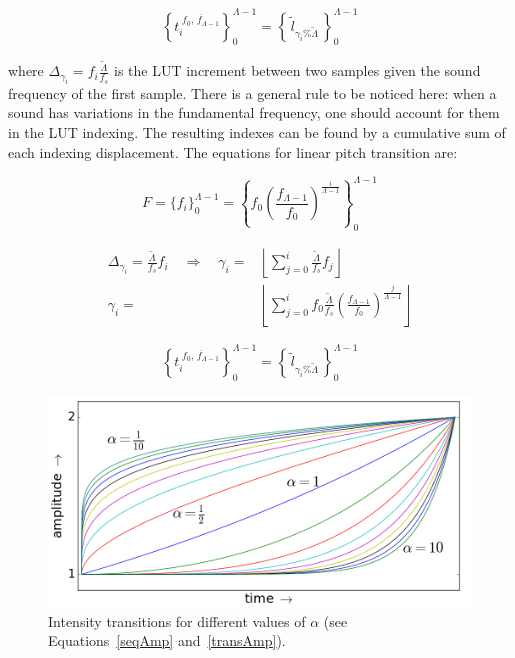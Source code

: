 \begin{equation}\label{serieAmostralLin}
 \left\{t_i^{\;\overline{f_0,\, f_{\Lambda-1}}}\right\}_0^{\Lambda-1}=\left\{\,\widetilde{l}_{\gamma_i \% \widetilde{\Lambda}}\,\right\}_0^{\Lambda-1}
\end{equation}

\noindent where $\Delta_{\gamma_i}=f_i\frac{\widetilde{\Lambda}}{f_s}$ is the LUT increment between two samples given the sound frequency of the first sample.
There is a general rule to be noticed here: when a sound has variations in the fundamental frequency,
one should account for them in the LUT indexing.
The resulting indexes can be found by a cumulative sum of each indexing displacement.
The equations for linear pitch transition are:

\begin{equation}\label{freqExponencial}
 F=\{f_i\}_0^{\Lambda-1}=  \left\{f_0 \left ( \frac{f_{\Lambda-1}}{f_0} \right ) ^{\frac{i}{\Lambda -1}} \right\}_0^{\Lambda-1}
\end{equation}

\begin{equation}\label{indiceExponencial}
\begin{split}
 \Delta_{\gamma_i}= \frac{\widetilde{\Lambda}}{f_s}f_i \quad \Rightarrow  \quad \gamma_i= & \left \lfloor \sum_{j=0}^{i} \frac{\widetilde{\Lambda}}{f_s}f_j \right \rfloor \\
	\gamma_i = & \left \lfloor \sum_{j=0}^{i} f_0 \frac{\widetilde{\Lambda}}{f_s} \left ( \frac{f_{\Lambda-1}}{f_0} \right ) ^{\frac{j}{\Lambda -1}} \right \rfloor
\end{split}
\end{equation}

\begin{equation}\label{serieAmostralLog}
 \left\{t_i^{\;\overline{f_0,\,f_{\Lambda-1}}}\right\}_0^{\Lambda-1}=\left\{\,\widetilde{l}_{\gamma_i \% \widetilde{\Lambda}}\,\right\}_0^{\Lambda-1}
\end{equation}

\begin{figure}[h!]
     \centering
         \includegraphics[width=.7\columnwidth]{figures/transicao_}
     \caption{Intensity transitions for different values of $\alpha$ (see Equations~\ref{seqAmp} and~\ref{transAmp}).}
         \label{fig:transicao}
\end{figure}

